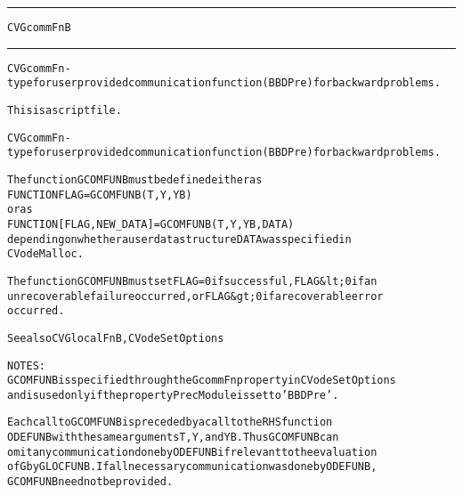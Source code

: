 \begin{samepage}
\hrule
\begin{center}
{\large \verb!CVGcommFnB!}
\label{p:CVGcommFnB}
\end{center}
\hrule\vspace{0.1in}



\begin{alltt}
CVGcommFn - type for user provided communication function (BBDPre) for backward problems.
\end{alltt}

\end{samepage}



\begin{samepage}


\begin{alltt}
This is a script file. 
\end{alltt}

\end{samepage}



\begin{alltt}
CVGcommFn - type for user provided communication function (BBDPre) for backward problems.

   The function GCOMFUNB must be defined either as
        FUNCTION FLAG = GCOMFUNB(T, Y, YB)
   or as
        FUNCTION [FLAG, NEW_DATA] = GCOMFUNB(T, Y, YB, DATA)
   depending on whether a user data structure DATA was specified in
   CVodeMalloc. 

   The function GCOMFUNB must set FLAG=0 if successful, FLAG&lt;0 if an
   unrecoverable failure occurred, or FLAG&gt;0 if a recoverable error
   occurred.

   See also CVGlocalFnB, CVodeSetOptions

   NOTES:
     GCOMFUNB is specified through the GcommFn property in CVodeSetOptions
     and is used only if the property PrecModule is set to 'BBDPre'.

     Each call to GCOMFUNB is preceded by a call to the RHS function
     ODEFUNB with the same arguments T, Y, and YB. Thus GCOMFUNB can
     omit any communication done by ODEFUNB if relevant to the evaluation
     of G by GLOCFUNB. If all necessary communication was done by ODEFUNB,
     GCOMFUNB need not be provided.
\end{alltt}






\vspace{0.1in}